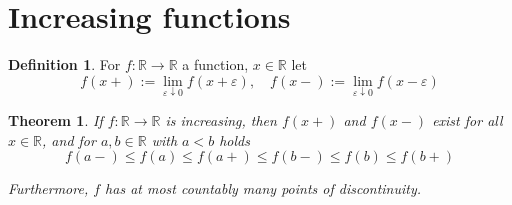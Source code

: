 \documentclass[11pt, a4paper, openany]{book}
\newtheorem{thm}{Theorem}\newtheorem{lem}{Lemma}\newtheorem{crl}{Corollary}
\theoremstyle{definition}
\newtheorem{define}{Definition}\newtheorem{exam}{Example}\newtheorem{remark}{Remark}
\begin{document}
\section{Increasing functions}
    \begin{define}
        For $f:\mathbb{R}\rightarrow \mathbb{R}$ a function, $x\in \mathbb{R}$ let
        \[
            f(x+):=\lim_{\varepsilon\downarrow 0}f(x+\varepsilon),\quad f(x-):=\lim_{\varepsilon\downarrow 0}f(x-\varepsilon)
        \]
    \end{define}
    \begin{thm}
        If $f:\mathbb{R}\rightarrow \mathbb{R}$ is increasing, then $f(x+)$ and $f(x-)$ exist for all $x\in\mathbb{R}$, and
        for $a,b\in\mathbb{R}$ with $a< b$ holds
        \[
            f(a-)\leqslant f(a)\leqslant f(a+)\leqslant f(b-)\leqslant f(b)\leqslant f(b+)
        \]

        Furthermore, $f$ has at most countably many points of discontinuity.
    \end{thm}
\end{document}
